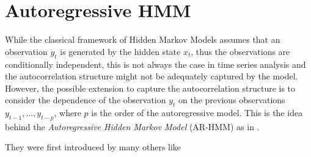 \section{Autoregressive HMM}

While the classical framework of Hidden Markov Models assumes that an observation $y_t$ is generated by the hidden state $x_t$, thus the observations are conditionally independent, this is not always the case 
in time series analysis and the autocorrelation structure might not be adequately captured by the model. However, the possible extension to capture the autocorrelation structure is to consider the dependence of the
observation $y_t$ on the previous observations $y_{t-1},\ldots,y_{t-p}$, where $p$ is the order of the autoregressive model. This is the idea behind the \textit{Autoregressive Hidden Markov Model} (AR-HMM) as in \citep{Ruiz-Suarez2021}.

They were first introduced by many others like \citep{Hamilton1989}